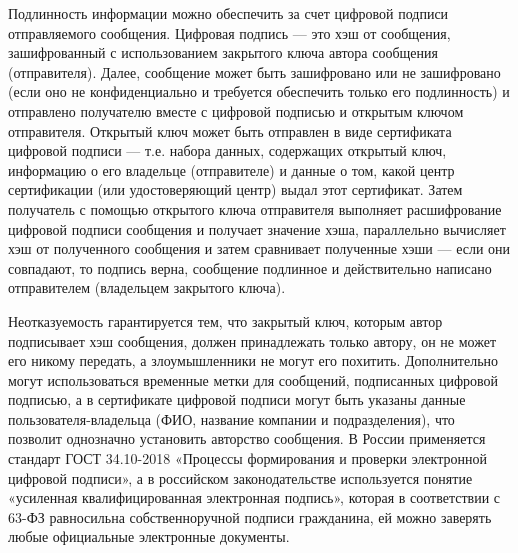 Подлинность информации можно обеспечить за счет цифровой подписи отправляемого
сообщения. Цифровая подпись — это хэш от сообщения, зашифрованный с
использованием закрытого ключа автора сообщения (отправителя). Далее, сообщение
может быть зашифровано или не зашифровано (если оно не конфиденциально и
требуется обеспечить только его подлинность) и отправлено получателю вместе с
цифровой подписью и открытым ключом отправителя. Открытый ключ может быть
отправлен в виде сертификата цифровой подписи — т.е. набора данных, содержащих
открытый ключ, информацию о его владельце (отправителе) и данные о том, какой
центр сертификации (или удостоверяющий центр) выдал этот сертификат. Затем
получатель с помощью открытого ключа отправителя выполняет расшифрование
цифровой подписи сообщения и получает значение хэша, параллельно вычисляет хэш
от полученного сообщения и затем сравнивает полученные хэши — если они
совпадают, то подпись верна, сообщение подлинное и действительно написано
отправителем (владельцем закрытого ключа).

Неотказуемость гарантируется тем, что закрытый ключ, которым автор подписывает
хэш сообщения, должен принадлежать только автору, он не может его никому
передать, а злоумышленники не могут его похитить. Дополнительно могут
использоваться временные метки для сообщений, подписанных цифровой подписью, а
в сертификате цифровой подписи могут быть указаны данные пользователя-владельца
(ФИО, название компании и подразделения), что позволит однозначно установить
авторство сообщения. В России применяется стандарт ГОСТ 34.10-2018 «Процессы
формирования и проверки электронной цифровой подписи», а в российском
законодательстве используется понятие «усиленная квалифицированная электронная
подпись», которая в соответствии с 63-ФЗ равносильна собственноручной подписи
гражданина, ей можно заверять любые официальные электронные документы.
